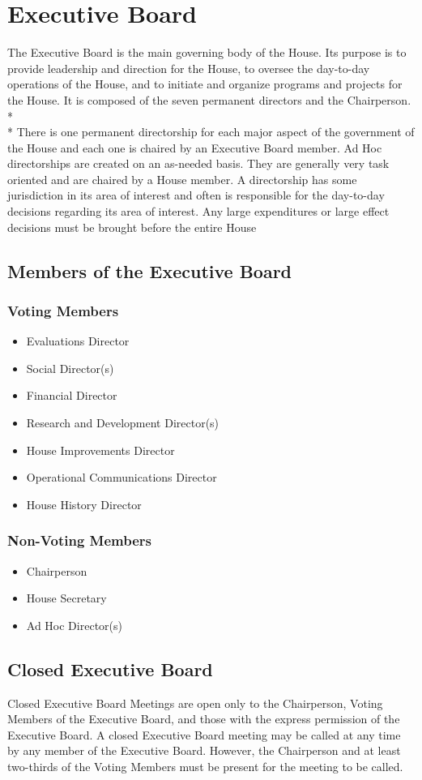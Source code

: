 \documentclass{article}
\newcommand{\article}[1]{\section{#1} \label{#1}}
\newcommand{\asection}[1]{\subsection{#1} \label{#1}}
\newcommand{\asubsection}[1]{\subsubsection{#1} \label{#1}}
\begin{document}
\article{Executive Board}
The Executive Board is the main governing body of the House.
Its purpose is to provide leadership and direction for the House, to oversee the day-to-day operations of the House, and to initiate and organize programs and projects for the House.
It is composed of the seven permanent directors and the Chairperson.
\\*\\*
There is one permanent directorship for each major aspect of the government of the House and each one is chaired by an Executive Board member.
Ad Hoc directorships are created on an as-needed basis.
They are generally very task oriented and are chaired by a House member.
A directorship has some jurisdiction in its area of interest and often is responsible for the day-to-day decisions regarding its area of interest.
Any large expenditures or large effect decisions must be brought before the entire House
\asection{Members of the Executive Board}
\asubsection{Voting Members}
\begin{itemize}
	\item Evaluations Director
	\item Social Director(s)
	\item Financial Director
	\item Research and Development Director(s)
	\item House Improvements Director
	\item Operational Communications Director
	\item House History Director
\end{itemize}
\asubsection{Non-Voting Members}
\begin{itemize}
	\item Chairperson
	\item House Secretary
	\item Ad Hoc Director(s)
\end{itemize}
\asection{Closed Executive Board}
Closed Executive Board Meetings are open only to the Chairperson, Voting Members of the Executive Board, and those with the express permission of the Executive Board.
A closed Executive Board meeting may be called at any time by any member of the Executive Board.
However, the Chairperson and at least two-thirds of the Voting Members must be present for the meeting to be called.
\end{document}
